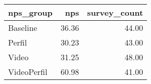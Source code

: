 \begin{tabular}{lrr}
  \hline
nps\_group & nps & survey\_count \\ 
  \hline
Baseline & 36.36 & 44.00 \\ 
  Perfil & 30.23 & 43.00 \\ 
  Video & 31.25 & 48.00 \\ 
  VideoPerfil & 60.98 & 41.00 \\ 
   \hline
\end{tabular}
